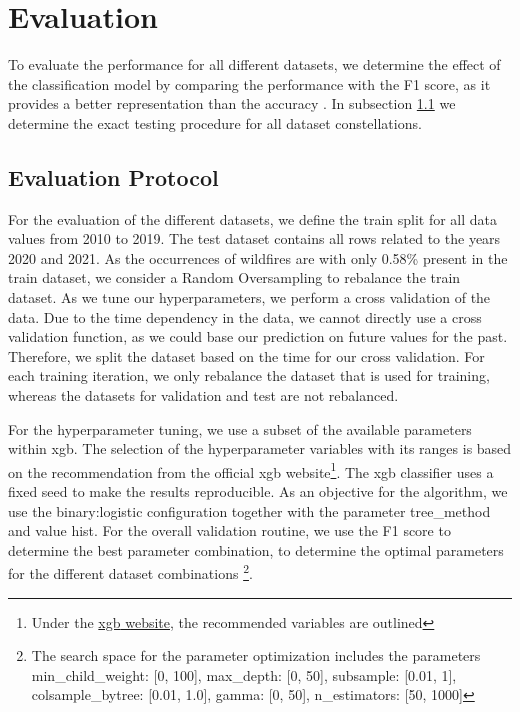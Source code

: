 \documentclass[
]{ceurart}
\begin{document}
\section{Evaluation}
To evaluate the performance for all different datasets, we determine the effect of the classification model by comparing the performance with the F1 score, as it provides a better representation than the accuracy \cite{Maimon.2010}. In subsection \ref{cha:EvaluationProtocol} we determine the exact testing procedure for all dataset constellations.

\subsection{Evaluation Protocol}\label{cha:EvaluationProtocol}
For the evaluation of the different datasets, we define the train split for all data values from 2010 to 2019. The test dataset contains all rows related to the years 2020 and 2021. As the occurrences of wildfires are with only 0.58\% present in the train dataset, we consider a Random Oversampling to rebalance the train dataset. As we tune our hyperparameters, we perform a cross validation of the data. Due to the time dependency in the data, we cannot directly use a cross validation function, as we could base our prediction on future values for the past. Therefore, we split the dataset based on the time for our cross validation. For each training iteration, we only rebalance the dataset that is used for training, whereas the datasets for validation and test are not rebalanced. 

For the hyperparameter tuning, we use a subset of the available parameters within \gls*{xgb}. The selection of the hyperparameter variables with its ranges is based on the recommendation from the official \gls*{xgb} website\footnote{Under the \href{https://xgboost.readthedocs.io/en/stable/tutorials/param_tuning.html}{\gls*{xgb} website}, the recommended variables are outlined}. The \gls*{xgb} classifier uses a fixed seed to make the results reproducible. As an objective for the algorithm, we use the binary:logistic configuration together with the parameter tree\_method and value hist. For the overall validation routine, we use the F1 score to determine the best parameter combination, to determine the optimal parameters for the different dataset combinations \footnote{The search space for the parameter optimization includes the parameters min\_child\_weight: [0, 100], max\_depth: [0, 50], subsample: [0.01, 1], colsample\_bytree: [0.01, 1.0], gamma: [0, 50], n\_estimators: [50, 1000]}. 
\end{document}
